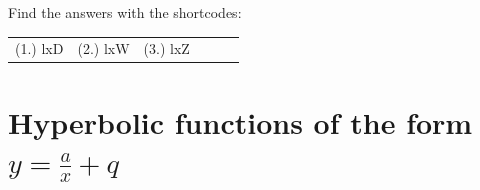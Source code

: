 \par {} Find the answers with the shortcodes:
\par \begin{tabular}[h]{cccccc}
(1.) lxD  &  (2.) lxW  &  (3.) lxZ  & \end{tabular}
%     
%     
%     

\section{Hyperbolic functions of the form $y=\frac{a}{x}+q$}
\nopagebreak
